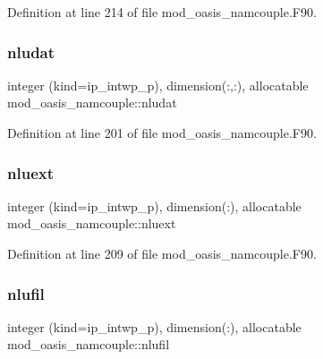 Definition at line 214 of file mod\+\_\+oasis\+\_\+namcouple.\+F90.

\mbox{\label{namespacemod__oasis__namcouple_abb7c2cd3a371bbb8ccd6a272d0e9b60f}} 
\subsubsection{\texorpdfstring{nludat}{nludat}}
{\footnotesize\ttfamily integer (kind=ip\+\_\+intwp\+\_\+p), dimension(\+:,\+:), allocatable mod\+\_\+oasis\+\_\+namcouple\+::nludat\hspace{0.3cm}{\ttfamily [private]}}



Definition at line 201 of file mod\+\_\+oasis\+\_\+namcouple.\+F90.

\mbox{\label{namespacemod__oasis__namcouple_a7510ecfe3d0f141252450e4ba66209ba}} 
\subsubsection{\texorpdfstring{nluext}{nluext}}
{\footnotesize\ttfamily integer (kind=ip\+\_\+intwp\+\_\+p), dimension(\+:), allocatable mod\+\_\+oasis\+\_\+namcouple\+::nluext\hspace{0.3cm}{\ttfamily [private]}}



Definition at line 209 of file mod\+\_\+oasis\+\_\+namcouple.\+F90.

\mbox{\label{namespacemod__oasis__namcouple_a31f62f64cbcf344e529d0576386d0751}} 
\subsubsection{\texorpdfstring{nlufil}{nlufil}}
{\footnotesize\ttfamily integer (kind=ip\+\_\+intwp\+\_\+p), dimension(\+:), allocatable mod\+\_\+oasis\+\_\+namcouple\+::nlufil\hspace{0.3cm}{\ttfamily [private]}}



